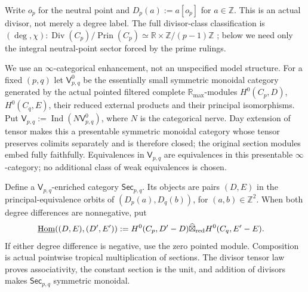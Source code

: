 \documentclass[11pt]{amsart}
\theoremstyle{definition}
\theoremstyle{remark}
\newcommand{\R}{\mathbb R}
\newcommand{\Z}{\mathbb Z}
\newcommand{\Div}{\operatorname{Div}}
\newcommand{\Prin}{\operatorname{Prin}}
\begin{document}
Write $o_p$ for the neutral point and
$D_p(a):=a[o_p]$ for $a\in\Z$.  This is an actual divisor, not merely a
degree label.  The full divisor-class classification is
$(\deg,\chi):\Div(C_p)/\Prin(C_p)\simeq
\R\times\Z/(p-1)\Z$ \cite[Theorem~5.6]{CC-ScalingSite}; below we need only
the integral neutral-point sector forced by the prime rulings.

We use an $\infty$-categorical enhancement, not an unspecified model
structure.  For a fixed $(p,q)$ let $\mathsf V^0_{p,q}$ be the essentially small
symmetric monoidal category generated by the actual pointed filtered
complete $\R_{\max}$-modules $H^0(C_p,D)$, $H^0(C_q,E)$, their reduced
external products and their principal isomorphisms.  Put
$\mathsf V_{p,q}:=\operatorname{Ind}(N\mathsf V^0_{p,q})$, where $N$ is the
categorical nerve.  Day extension of
tensor makes this a presentable symmetric monoidal category whose tensor
preserves colimits separately and is therefore closed; the original section modules embed fully
faithfully.  Equivalences in $\mathsf V_{p,q}$ are equivalences in this
presentable $\infty$-category; no additional class of weak equivalences is
chosen.

Define a $\mathsf V_{p,q}$-enriched category $\mathsf{Sec}_{p,q}$.  Its
objects are pairs $(D,E)$ in the principal-equivalence orbits of
$(D_p(a),D_q(b))$, for $(a,b)\in\Z^2$.  When both degree differences are
nonnegative, put
\begin{align}\label{eq:periodicEnrichedHom}
 \underline{\operatorname{Hom}}((D,E),(D',E'))
 &:={H^0(C_p,D'-D)}\widehat\boxtimes_{\rm red}{H^0(C_q,E'-E)}.
\end{align}
If either degree difference is negative, use the zero pointed module.
Composition is actual pointwise tropical multiplication of sections.  The
divisor tensor law proves associativity, the constant section is the unit,
and addition of divisors makes $\mathsf{Sec}_{p,q}$ symmetric monoidal.
\end{document}
